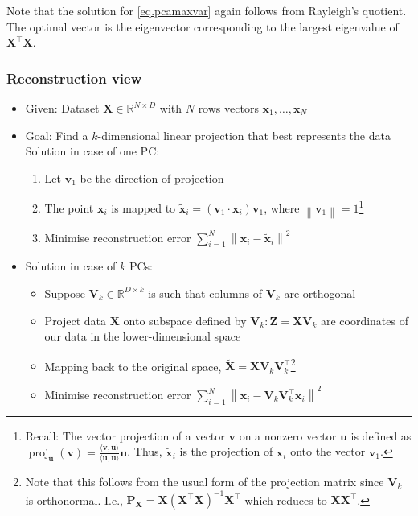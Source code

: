 \documentclass[11pt, %
	oneside, %
	english, %
	onehalfspacing, %
	parskip, %
	]{article} %
\theoremstyle{definition}
\begin{document}
Note that the solution for \eqref{eq.pcamaxvar} again follows from Rayleigh's quotient. The optimal vector is the eigenvector corresponding to the largest eigenvalue of $\mathbf{X}^\top \mathbf{X}$.


\subsubsection*{Reconstruction view}

\begin{itemize}
	\item Given: Dataset $\mathbf{X} \in \mathbb{R}^{N \times D}$ with $N$ rows vectors $\mathbf{x}_1, \ldots, \mathbf{x}_N$
	\item Goal: Find a $k$-dimensional linear projection that best represents the data
	Solution in case of one PC:
	\begin{enumerate}
		\item Let $\mathbf{v}_1$ be the direction of projection
		\item The point $\mathbf{x}_i$ is mapped to $\tilde{\mathbf{x}}_i=\left(\mathbf{v}_1 \cdot \mathbf{x}_i\right) \mathbf{v}_1$, where $\left\|\mathbf{v}_1\right\|=1$\footnote{Recall: The vector projection of a vector $\mathbf{v}$ on a nonzero vector $\mathbf{u}$ is defined as $\operatorname{proj}_{\mathbf{u}}(\mathbf{v})=\frac{\langle\mathbf{v}, \mathbf{u}\rangle}{\langle\mathbf{u}, \mathbf{u}\rangle} \mathbf{u}$. Thus, $\tilde{\mathbf{x}}_i$ is the projection of $\mathbf{x}_i$ onto the vector $\mathbf{v}_1$.}
		\item Minimise reconstruction error $\sum_{i=1}^N\left\|\mathbf{x}_i-\tilde{\mathbf{x}}_i\right\|^2$
	\end{enumerate}
	\item Solution in case of $k$ PCs:
	\begin{itemize}
		\item Suppose $\mathbf{V}_k \in \mathbb{R}^{D \times k}$ is such that columns of $\mathbf{V}_k$ are orthogonal
		\item Project data $\mathbf{X}$ onto subspace defined by $\mathbf{V}_k: \mathbf{Z}=\mathbf{X} \mathbf{V}_k$ are coordinates of our data in the lower-dimensional space
		\item Mapping back to the original space, $\tilde{\mathbf{X}} = \mathbf{X} \mathbf{V}_k \mathbf{V}_k^\top$\footnote{Note that this follows from the usual form of the projection matrix since $\mathbf{V}_k$ is orthonormal. I.e., $\mathbf{P}_\mathbf{X} =  \mathbf{X}(\mathbf{X}^\top \mathbf{X})^{-1}\mathbf{X}^\top$ which reduces to $\mathbf{X}\mathbf{X}^\top$.}
		\item Minimise reconstruction error $\sum_{i=1}^N\left\|\mathbf{x}_i-\mathbf{V}_k \mathbf{V}_k^{\top} \mathbf{x}_i\right\|^2$
	\end{itemize}
\end{itemize}
\end{document}
